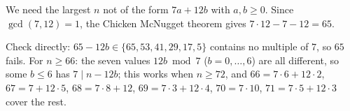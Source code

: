 We need the largest $n$ not of the form $7a+12b$ with $a,b\ge0$. Since $\gcd(7,12)=1$, the Chicken McNugget theorem gives $7\cdot12-7-12=\boxed{65}$.

Check directly: $65-12b\in\{65,53,41,29,17,5\}$ contains no multiple of $7$, so $65$ fails. For $n\ge66$: the seven values $12b\bmod7$ ($b=0,\dots,6$) are all different, so some $b\le6$ has $7\mid n-12b$; this works when $n\ge72$, and $66=7\cdot6+12\cdot2$, $67=7+12\cdot5$, $68=7\cdot8+12$, $69=7\cdot3+12\cdot4$, $70=7\cdot10$, $71=7\cdot5+12\cdot3$ cover the rest.
